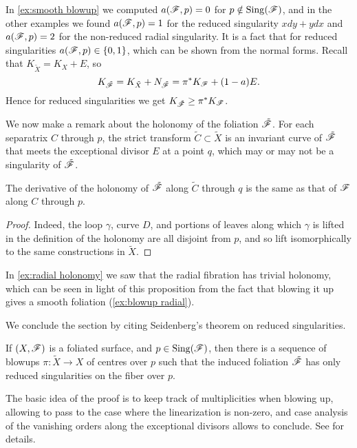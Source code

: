 In \cref{ex:smooth blowup} we computed $a(\mathscr{F},p)=0$ for
$p\notin\operatorname{Sing}(\mathscr{F})$, and in the other examples we found $a(\mathscr{F},p)=1$ for the
reduced singularity $xdy+ydx$ and $a(\mathscr{F},p)=2$ for the non-reduced radial
singularity. It is a fact that for reduced singularities $a(\mathscr{F},p)\in\{0,1\}$,
which can be shown from the normal forms. Recall that $K_{\tilde X}=K_X+E$, so
\begin{equation*}
    K_{\tilde{\mathscr{F}}}
        = K_{\tilde X}+N_{\tilde{\mathscr{F}}}
        = \pi^*K_{\mathscr{F}}+(1-a)E.
\end{equation*}
Hence for reduced singularities we get $K_{\tilde{\mathscr{F}}}\ge\pi^*K_{\mathscr{F}}$.

We now make a remark about the holonomy of the foliation $\tilde{\mathscr{F}}$. For each
separatrix $C$ through $p$, the strict transform $\tilde C\subset\tilde X$ is an
invariant curve of $\tilde{\mathscr{F}}$ that meets the exceptional divisor $E$ at a
point $q$, which may or may not be a singularity of $\tilde{\mathscr{F}}$.

\begin{proposition}\label{prop:blowup holonomy}
    The derivative of the holonomy of $\tilde{\mathscr{F}}$ along $\tilde C$ through $q$
    is the same as that of $\mathscr{F}$ along $C$ through $p$.
\end{proposition}

\begin{proof}
    Indeed, the loop $\gamma$, curve $D$, and portions of leaves along which
    $\gamma$ is lifted in the definition of the holonomy are all disjoint from
    $p$, and so lift isomorphically to the same constructions in $\tilde X$.
\end{proof}

\begin{example}
    In \cref{ex:radial holonomy} we saw that the radial fibration has trivial
    holonomy, which can be seen in light of this proposition from the fact that
    blowing it up gives a smooth foliation (\cref{ex:blowup radial}).
\end{example}

We conclude the section by citing Seidenberg's theorem on reduced singularities.

\begin{theorem}\label{thm:seidenberg}
    If $(X,\mathscr{F})$ is a foliated surface, and $p\in\operatorname{Sing}(\mathscr{F})$, then there is
    a sequence of blowups $\pi:\tilde X\to X$ of centres over $p$ such that the
    induced foliation $\tilde{\mathscr{F}}$ has only reduced singularities on the fiber
    over $p$.
\end{theorem}

The basic idea of the proof is to keep track of multiplicities when blowing up,
allowing to pass to the case where the linearization is non-zero, and case
analysis of the vanishing orders along the exceptional divisors allows to
conclude. See \cite[\S1]{brunella_book} for details.
